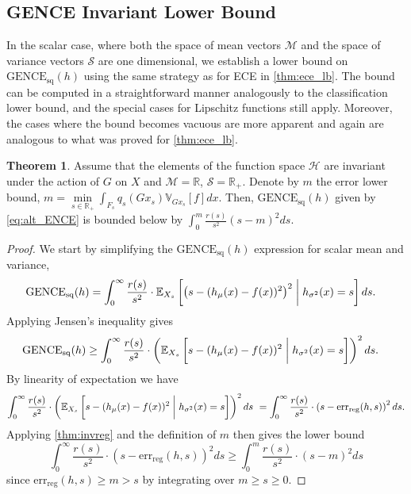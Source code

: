 \documentclass[10pt]{article} %
\theoremstyle{definition}
\newtheorem{thm}{Theorem}
\newcommand{\GENCESQ}{\mathrm{GENCE}_{\mathrm{sq}}(h)}
\begin{document}
\subsection{GENCE Invariant Lower Bound}

In the scalar case, where both the space of mean vectors $\mathcal{M}$ and the space of variance vectors $\mathcal{S}$ are one dimensional, we establish a lower bound on $\GENCESQ$ using the same strategy as for ECE in \cref{thm:ece_lb}. The bound can be computed in a straightforward manner analogously to the classification lower bound, and the special cases for Lipschitz functions still apply. Moreover, the cases where the bound becomes vacuous are more apparent and again are analogous to what was proved for \cref{thm:ece_lb}. 

\begin{thm}
Assume that the elements of the function space $\mathscr{H}$ are invariant under the action of $G$ on $X$ and $\mathcal{M} = \mathbb{R}$, $\mathcal{S} = \mathbb{R}_+$. Denote by $m$ the error lower bound, $m = \underset{s \in \mathbb{R}_+}{\min} \int_{F_s}q_s(Gx_s)\mathbb{V}_{Gx_s}[f]dx$. Then, $\GENCESQ$ given by \cref{eq:alt_ENCE} is bounded below by $\int_0^m\frac{r(s)}{s^2}(s-m)^2ds$. 
\end{thm}

\begin{proof}
We start by simplifying the $\GENCESQ$ expression for scalar mean and variance, 
%
\begin{align*}
\GENCESQ &= \int_0^\infty  \frac{r(s)}{s^2}  \cdot \mathbb{E}_{X_s}\left[ \left(s -  (h_{\mu}(x) - f(x))^2\right) ^2 \biggm| h_{\sigma^2}(x) = s\right]   ds.
\end{align*}
%
Applying Jensen's inequality gives
%
\begin{align*}
\GENCESQ &\geq \int_0^\infty  \frac{r(s)}{s^2}  \cdot \left(\mathbb{E}_{X_s}\left[ s - (h_{\mu}(x) - f(x))^2 \biggm| h_{\sigma^2}(x) = s\right] \right)^2  ds.
\end{align*}
%
By linearity of expectation we have
\begin{align*}
\int_0^\infty  \frac{r(s)}{s^2}  \cdot \left(\mathbb{E}_{X_s}\left[ s - (h_{\mu}(x) - f(x))^2 \biggm| h_{\sigma^2}(x) = s\right] \right)^2  ds\ = \int_0^\infty  \frac{r(s)}{s^2}  \cdot \left(s - \text{err}_{\text{reg}}(h,s)\right)^2  ds.
\end{align*}
% 
Applying \cref{thm:invreg} and the definition of $m$ then gives the lower bound 
%
\begin{equation*}
\int_0^\infty  \frac{r(s)}{s^2}  \cdot \left(s - \text{err}_{\text{reg}}(h,s)\right)^2  ds \geq \int_0^m \frac{r(s)}{s^2} \cdot (s - m)^2ds   
\end{equation*}
%
since $\text{err}_{\text{reg}}(h,s) \geq m > s$ by integrating over $m \geq s \geq 0$.
\end{proof}
\end{document}
